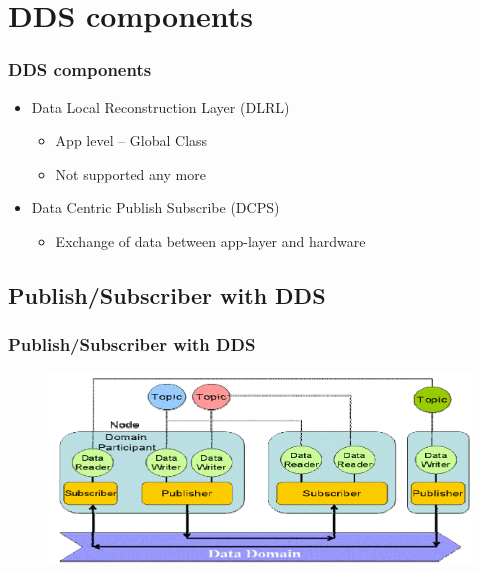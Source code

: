 \documentclass{beamer}
\begin{document}
	
	
\section{DDS components}
	\begin{frame}
		\frametitle{DDS components}
		
	
		\begin{itemize}
		\item Data Local Reconstruction Layer (DLRL)
		
			\begin{itemize}
			\item App level -- Global Class
			\item Not supported any more
			\end{itemize}
		
		\item Data Centric Publish Subscribe (DCPS)
		
			\begin{itemize}
			\item Exchange of data between app-layer and hardware
			\end{itemize}
		
		\end{itemize}
		
	\end{frame}
	
	
	
\subsection{Publish/Subscriber with DDS}
	\begin{frame}
		\frametitle{Publish/Subscriber with DDS}

		\begin{figure}[hbtp]
		\centering
		\includegraphics[scale=0.65]{DDSentities}
		\end{figure}
	\end{frame}
\end{document}
